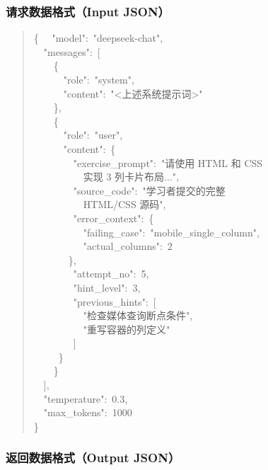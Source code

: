 \begin{appendices}
\subsubsection*{请求数据格式（Input JSON）}

\begin{quote}\small\ttfamily
\{
\ \ "model":\ "deepseek-chat",\\
\ \ "messages":\ [\\
\ \ \ \ \{\\
\ \ \ \ \ \ "role":\ "system",\\
\ \ \ \ \ \ "content":\ "<上述系统提示词>"\\
\ \ \ \ \},\\
\ \ \ \ \{\\
\ \ \ \ \ \ "role":\ "user",\\
\ \ \ \ \ \ "content":\ \{\\
\ \ \ \ \ \ \ \ "exercise\_prompt":\ "请使用 HTML 和 CSS\\
\ \ \ \ \ \ \ \ \ \ 实现 3 列卡片布局...",\\
\ \ \ \ \ \ \ \ "source\_code":\ "学习者提交的完整\\
\ \ \ \ \ \ \ \ \ \ HTML/CSS 源码",\\
\ \ \ \ \ \ \ \ "error\_context":\ \{\\
\ \ \ \ \ \ \ \ \ \ "failing\_case":\ "mobile\_single\_column",\\
\ \ \ \ \ \ \ \ \ \ "actual\_columns":\ 2\\
\ \ \ \ \ \ \ \},\\
\ \ \ \ \ \ \ \ "attempt\_no":\ 5,\\
\ \ \ \ \ \ \ \ "hint\_level":\ 3,\\
\ \ \ \ \ \ \ \ "previous\_hints":\ [\\
\ \ \ \ \ \ \ \ \ \ "检查媒体查询断点条件",\\
\ \ \ \ \ \ \ \ \ \ "重写容器的列定义"\\
\ \ \ \ \ \ \ \ ]\\
\ \ \ \ \ \}\\
\ \ \ \ \}\\
\ \ ],\\
\ \ "temperature":\ 0.3,\\
\ \ "max\_tokens":\ 1000\\
\}
\end{quote}

\subsubsection*{返回数据格式（Output JSON）}


\end{appendices}
